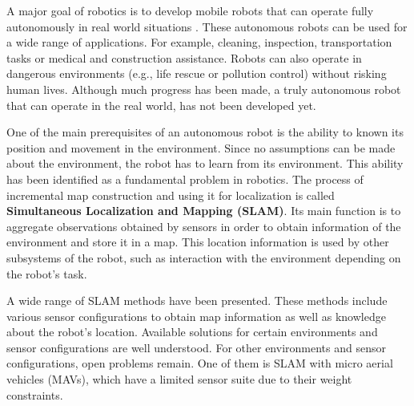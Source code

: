 A major goal of robotics is to develop mobile robots that can operate fully autonomously in real world situations \cite{murphy2000introduction}.
These autonomous robots can be used for a wide range of applications.
For example, cleaning, inspection, transportation tasks or medical and construction assistance.
Robots can also operate in dangerous environments (e.g., life rescue or pollution control) without risking human lives.
Although much progress has been made, a truly autonomous robot that can operate in the real world, has not been developed yet.

One of the main prerequisites of an autonomous robot is the ability to known its position and movement in the environment.
Since no assumptions can be made about the environment, the robot has to learn from its environment.
This ability has been identified as a fundamental problem in robotics.
The process of incremental map construction and using it for localization is called \textbf{Simultaneous Localization and Mapping (SLAM)}.
Its main function is to aggregate observations obtained by sensors in order to obtain information of the environment and store it in a map.
This location information is used by other subsystems of the robot, such as interaction with the environment depending on the robot's task.

A wide range of SLAM methods have been presented.
These methods include various sensor configurations to obtain map information as well as knowledge about the robot's location.
Available solutions for certain environments and sensor configurations are well understood.
For other environments and sensor configurations, open problems remain.
One of them is SLAM with micro aerial vehicles (MAVs), which have a limited sensor suite due to their weight constraints.

